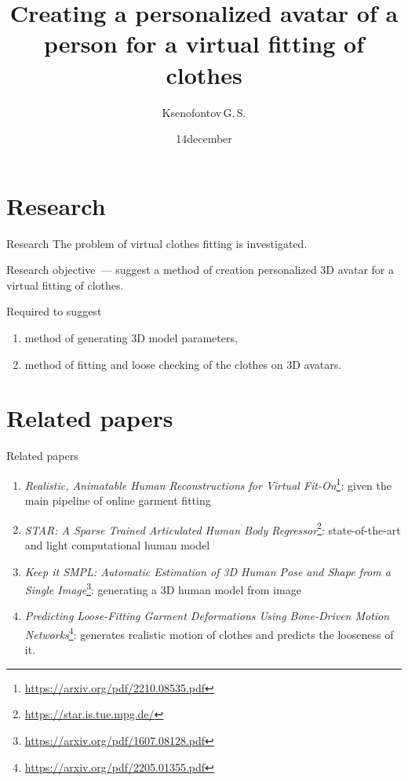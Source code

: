 \documentclass[10pt,pdf,hyperref={unicode}]{beamer}
\title[]{Creating a personalized avatar of a person for a virtual fitting of clothes}
\author{Ksenofontov\,G.\,S.}
\institute[]{Moscow Institute of Physics and Technology (National Research University)}
\date[2022]{\small 14\;december\;2022}
\begin{document}
\begin{frame}
\titlepage
\end{frame}

\section{Research}
\begin{frame}{Research}
\bigskip
The problem of virtual clothes fitting is investigated.
\begin{block}{Research objective~---}
suggest a method of creation personalized 3D avatar for a virtual fitting of clothes.
\end{block}
\begin{block}{Required to suggest}
\justifying
\begin{enumerate}[1.]
    \item method of generating 3D model parameters,
    \item method of fitting and loose checking of the clothes on 3D avatars.
\end{enumerate}
\end{block}
\end{frame}

\section{Related papers}
\begin{frame}{Related papers}
\begin{enumerate}[1.]
    \item \textit{Realistic, Animatable Human Reconstructions for Virtual Fit-On}\footnote{\url{https://arxiv.org/pdf/2210.08535.pdf}}: given the main pipeline of online garment fitting
    \item \textit{STAR: A Sparse Trained Articulated Human Body Regressor}\footnote{\url{https://star.is.tue.mpg.de/}}: state-of-the-art and light computational human model
    \item \textit{Keep it SMPL: Automatic Estimation of 3D Human Pose and Shape from a Single Image}\footnote{\url{https://arxiv.org/pdf/1607.08128.pdf}}: generating a 3D human model from image 
    \item \textit{Predicting Loose-Fitting Garment Deformations Using Bone-Driven Motion Networks}\footnote{\url{https://arxiv.org/pdf/2205.01355.pdf}}: generates realistic motion of clothes and predicts the looseness of it. 
\end{enumerate}
\end{frame}
\end{document}
